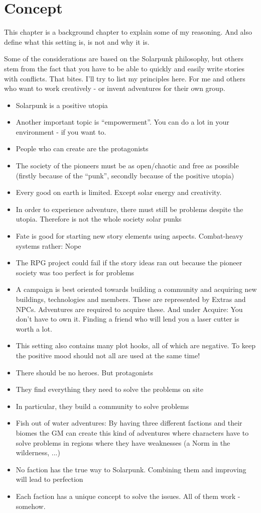 \chapter{Concept}

This chapter is a background chapter to explain some of my reasoning. And also define what this setting is, is not and why it is.

Some of the considerations are based on the Solarpunk philosophy, but others stem from the fact that
you have to be able to quickly and easily write stories with conflicts. That bites. I'll try to list my principles here. For me and others who want to work creatively - or invent adventures for their own group.

\begin{itemize}
\item Solarpunk is a positive utopia
\item Another important topic is “empowerment”. You can do a lot in your environment - if you want to.
\item People who can create are the protagonists
\item The society of the pioneers must be as open/chaotic and free as possible (firstly because of the “punk”, secondly
because of the positive utopia)
\item Every good on earth is limited. Except solar energy and creativity.
\item In order to experience adventure, there must still be problems despite the utopia. Therefore is not the whole society
solar punks
\item Fate is good for starting new story elements using aspects. Combat-heavy systems rather: Nope
\item The RPG project could fail if the story ideas ran out because the pioneer society was too perfect
is for problems
\item A campaign is best oriented towards building a community and acquiring new buildings, technologies and
members. These are represented by Extras and NPCs. Adventures are required to acquire these. And under
Acquire: You don't have to own it. Finding a friend who will lend you a laser cutter is worth a lot.
\item This setting also contains many plot hooks, all of which are negative. To keep the positive mood should
not all are used at the same time!
\item There should be no heroes. But protagonists
\item They find everything they need to solve the problems on site
\item In particular, they build a community to solve problems
\item Fish out of water adventures: By having three different factions and their biomes the GM can create this kind of adventures where characters have to solve problems in regions where they have weaknesses (a Norm in the wilderness, ...)
\item No faction has the true way to Solarpunk. Combining them and improving will lead to perfection
\item Each faction has a unique concept to solve the issues. All of them work - somehow.
\end{itemize}


